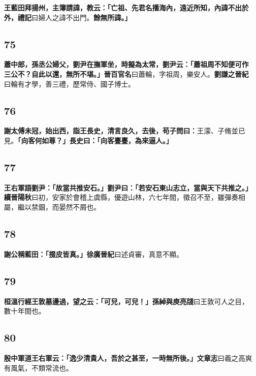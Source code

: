 \textbf{王藍田拜揚州，主簿請諱，教云：「亡祖、先君名播海內，遠近所知，內諱不出於外，}{\footnotesize \textbf{禮記}曰婦人之諱不出門。}\textbf{餘無所諱。」}

\subsection*{75}

\textbf{蕭中郎，孫丞公婦父，劉尹在撫軍坐，時擬為太常，劉尹云：「蕭祖周不知便可作三公不？自此以還，無所不堪。」}{\footnotesize \textbf{晉百官名}曰蕭輪，字祖周，樂安人。\textbf{劉謙之晉紀}曰輪有才學，善三禮，歷常侍、國子博士。}

\subsection*{76}

\textbf{謝太傅未冠，始出西，詣王長史，清言良久，去後，苟子問曰：}{\footnotesize 王濛、子脩並已見。}\textbf{「向客何如尊？」長史曰：「向客亹亹，為來逼人。」}

\subsection*{77}

\textbf{王右軍語劉尹：「故當共推安石。」劉尹曰：「若安石東山志立，當與天下共推之。」}{\footnotesize \textbf{續晉陽秋}曰初，安家於會稽上虞縣，優遊山林，六七年間，徵召不至，雖彈奏相屬，繼以禁錮，而晏然不屑也。}

\subsection*{78}

\textbf{謝公稱藍田：「掇皮皆真。」}{\footnotesize \textbf{徐廣晉紀}曰述貞審，真意不顯。}

\subsection*{79}

\textbf{桓溫行經王敦墓邊過，望之云：「可兒，可兒！」}{\footnotesize \textbf{孫綽與庾亮牋}曰王敦可人之目，數十年間也。}

\subsection*{80}

\textbf{殷中軍道王右軍云：「逸少清貴人，吾於之甚至，一時無所後。」}{\footnotesize \textbf{文章志}曰羲之高爽有風氣，不類常流也。}

